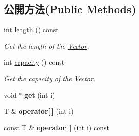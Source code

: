 \subsection*{公開方法(Public Methods)}
\begin{DoxyCompactItemize}
\item 
int \hyperlink{class_i_dream_sky_1_1_vector_ac4d19b6d0c51f31abb9fa1e976ba98fe}{length} () const 
\begin{DoxyCompactList}\small\item\em Get the length of the \hyperlink{class_i_dream_sky_1_1_vector}{Vector}. \end{DoxyCompactList}\item 
int \hyperlink{class_i_dream_sky_1_1_vector_aaa042b05af8040fa6ab9e7b6d3b17892}{capacity} () const 
\begin{DoxyCompactList}\small\item\em Get the capacity of the \hyperlink{class_i_dream_sky_1_1_vector}{Vector}. \end{DoxyCompactList}\item 
void $\ast$ {\bfseries get} (int i)\hypertarget{class_i_dream_sky_1_1_vector_afe49d66bcf2e49879bfb426596f2831e}{}\label{class_i_dream_sky_1_1_vector_afe49d66bcf2e49879bfb426596f2831e}

\item 
T \& {\bfseries operator\mbox{[}$\,$\mbox{]}} (int i)\hypertarget{class_i_dream_sky_1_1_vector_a8245119bf31c510928386dae9ccff922}{}\label{class_i_dream_sky_1_1_vector_a8245119bf31c510928386dae9ccff922}

\item 
const T \& {\bfseries operator\mbox{[}$\,$\mbox{]}} (int i) const \hypertarget{class_i_dream_sky_1_1_vector_a3c60a975638374e24f1875674bdf3e3b}{}\label{class_i_dream_sky_1_1_vector_a3c60a975638374e24f1875674bdf3e3b}


\end{DoxyCompactItemize}
